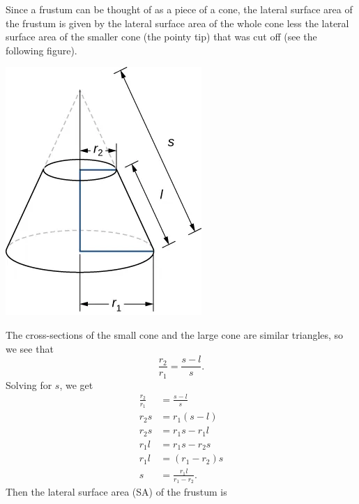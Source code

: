 \documentclass{report}
\begin{document}
    \bigbreak \noindent 
    \begin{minipage}[]{0.47\textwidth}
        Since a frustum can be thought of as a piece of a cone, the lateral surface area of the frustum is given by the lateral surface area of the whole cone less the lateral surface area of the smaller cone (the pointy tip) that was cut off (see the following figure).
    \end{minipage}
    \begin{minipage}[]{0.49\textwidth}
        \begin{center}
            \includegraphics[scale=0.5]{./figures/graph35.png}
        \end{center}
    \end{minipage}
    \bigbreak \noindent 
    \pagebreak \bigbreak \noindent 
    The cross-sections of the small cone and the large cone are similar triangles, so we see that
    \[
    \frac{r_2}{r_1} = \frac{s - l}{s}.
    \]
    Solving for \( s \), we get
    \begin{align*}
        \frac{r_{2}}{r_{1}} &= \frac{s-l}{s} \\
        r_{2}s &= r_{1}(s-l) \\
        r_{2}s &= r_{1}s - r_{1}l \\
        r_{1}l &= r_{1}s - r_{2}s \\
        r_{1}l &= (r_{1} - r_{2})s \\
        s &= \frac{r_{1}l}{r_{1}-r_{2}}
    .\end{align*}
    \bigbreak \noindent 
    Then the lateral surface area (SA) of the frustum is
\end{document}
